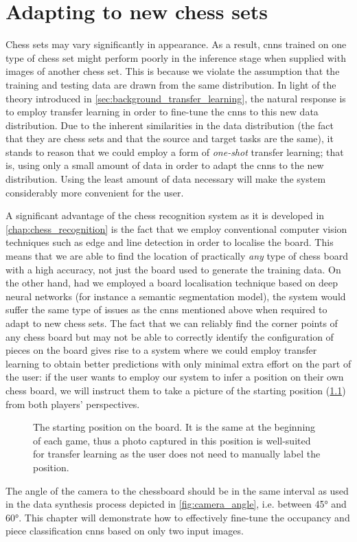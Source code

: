 \documentclass[../report.tex]{subfiles}
\begin{document}
\chapter{Adapting to new chess sets}
\label{chap:adapting}

Chess sets may vary significantly in appearance. 
As a result, \glspl{cnn} trained on one type of chess set might perform poorly in the inference stage when supplied with images of another chess set. 
This is because we violate the assumption that the training and testing data are drawn from the same distribution.
In light of the theory introduced in \cref{sec:background_transfer_learning}, the natural response is to employ transfer learning in order to fine-tune the \glspl{cnn} to this new data distribution.
Due to the inherent similarities in the data distribution (the fact that they are chess sets and that the source and target tasks are the same), it stands to reason that we could employ a form of \emph{one-shot} transfer learning; 
that is, using only a small amount of data in order to adapt the \glspl{cnn} to the new distribution.
Using the least amount of data necessary will make the system considerably more convenient for the user.

A significant advantage of the chess recognition system as it is developed in \cref{chap:chess_recognition} is the fact that we employ conventional computer vision techniques such as edge and line detection in order to localise the board.
This means that we are able to find the location of practically \emph{any} type of chess board with a high accuracy, not just the board used to generate the training data.
On the other hand, had we employed a board localisation technique based on deep neural networks (for instance a semantic segmentation model), the system would suffer the same type of issues as the \glspl{cnn} mentioned above when required to adapt to new chess sets.
The fact that we can reliably find the corner points of any chess board but may not be able to correctly identify the configuration of pieces on the board gives rise to a system where we could employ transfer learning to obtain better predictions with only minimal extra effort on the part of the user:
if the user wants to employ our system to infer a position on their own chess board, we will instruct them to take a picture of the starting position (\cref{fig:chess_start_position}) from both players' perspectives.
\begin{figure}[h]
    \centering
    \newgame
    \showboard
    \caption[The starting position on the board.]{The starting position on the board. It is the same at the beginning of each game, thus a photo captured in this position is well-suited for transfer learning as the user does not need to manually label the position.}
    \label{fig:chess_start_position}
\end{figure}
The angle of the camera to the chessboard should be in the same interval as used in the data synthesis process depicted in \cref{fig:camera_angle}, i.e. between 45° and 60°.
This chapter will demonstrate how to effectively fine-tune the occupancy and piece classification \glspl{cnn} based on only two input images.
\end{document}
